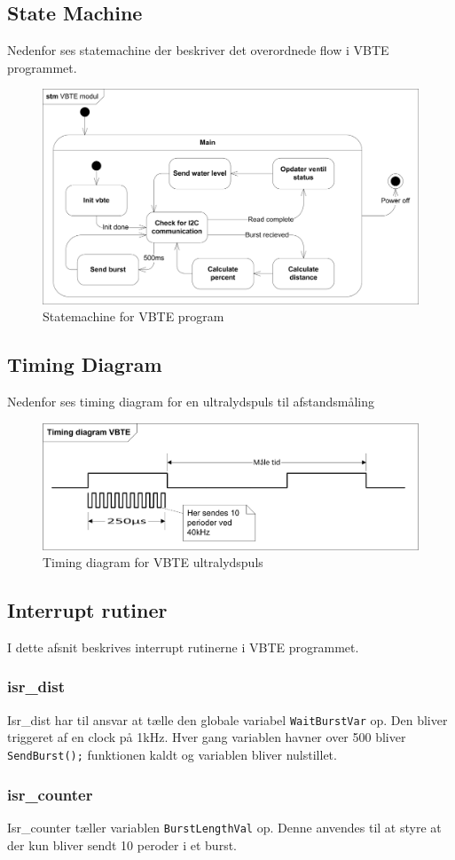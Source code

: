 \subsection{State Machine}
Nedenfor ses statemachine der beskriver det overordnede flow i VBTE programmet.
\begin{figure}[H]
\centering
\includegraphics[width=1\textwidth]{billeder/STMVBTE}
\caption{Statemachine for VBTE program}
\end{figure}

\subsection{Timing Diagram}
Nedenfor ses timing diagram for en ultralydspuls til afstandsmåling
\begin{figure}[H]
\centering
\includegraphics[scale=1]{billeder/TimingdiagramVBTE}
\caption{Timing diagram for VBTE ultralydspuls}
\end{figure}

\subsection{Interrupt rutiner}
I dette afsnit beskrives interrupt rutinerne i VBTE programmet. 
\subsubsection{isr\_dist}
Isr\_dist har til ansvar at tælle den globale variabel \texttt{WaitBurstVar} op. Den bliver triggeret af en clock på 1kHz. Hver gang variablen havner over 500 bliver \texttt{SendBurst();} funktionen kaldt og variablen bliver nulstillet.
\subsubsection{isr\_counter}
Isr\_counter tæller variablen \texttt{BurstLengthVal} op. Denne anvendes til at styre at der kun bliver sendt 10 peroder i et burst.